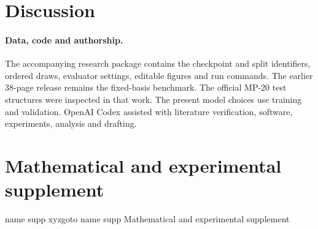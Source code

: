 \documentclass[10pt]{article}
\newcommand{\marksection}[2]{\pdfdest name {#1} xyz\pdfoutline goto name {#1} {#2}}
\begin{document}
\section{Discussion}

\paragraph{Data, code and authorship.}
The accompanying research package contains the checkpoint and split identifiers, ordered draws, evaluator settings, editable figures and run commands. The earlier 38-page release remains the fixed-basis benchmark. The official MP-20 test structures were inspected in that work. The present model choices use training and validation. OpenAI Codex assisted with literature verification, software, experiments, analysis and drafting.

\clearpage
\appendix
\section*{Mathematical and experimental supplement}
\marksection{supp}{Mathematical and experimental supplement}




\end{document}
